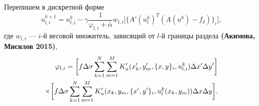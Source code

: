 \documentclass[10pt,pdf, mathserif, hyperref={unicode}]{beamer}
\begin{document}
\begin{frame}
	Перепишем в дискретной форме
	\begin{equation*}\label{comp_lm_meth_disc}
	u_{l,i}^{k+1}=u_{l,i}^k-\gamma\frac{1}{\varphi_{l,i}+\bar{\alpha}}w_{l,i}\bigg[ \{A'(u_l^k)^T(A(u^k)-f_\delta)\}_i\bigg],
	\end{equation*}
	где $w_{l,i}$ --- $i$-й весовой множитель, зависящий от $l$-й границы раздела \textbf{\color{red}(Акимова, Мисилов 2015)},
	\begin{equation*}
	\begin{aligned}
	\varphi_{l,i}=\bigg[ f\Delta\sigma\sum\limits_{k=1}^{N}
	\sum\limits_{m=1}^{M}
	K'_u(x'_k,y'_m, \{x, y\}_i, u_{l,i}^k) \Delta x' \Delta y'\bigg] \notag \\ \times\bigg[f\Delta\sigma\sum\limits_{k=1}^{N}
	\sum\limits_{m=1}^{M}K'_u(x_k,y_m, \{x',y'\}_i,u_l^k(x_k,y_m))\Delta x \Delta y\bigg]. 
	\end{aligned}
	\end{equation*}
	\let\thefootnote\relax\let\thefootnote\relax{}
\end{frame}
\end{document}
